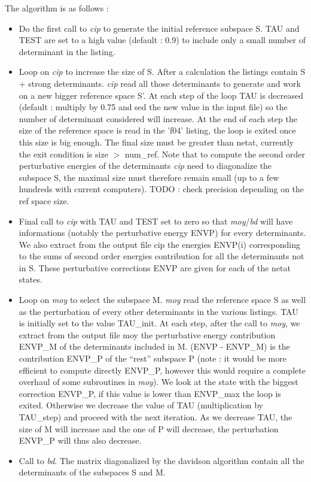 \documentclass[a4paper,10pt]{article}
\begin{document}
The algorithm is as follows :
\begin{itemize}
 \item Do the first call to \textit{cip} to generate the initial reference subspace S. TAU and TEST are set to a high value (default : 0.9) to include only a small number of determinant in the listing.
 \item Loop on \textit{cip} to increase the size of S. After a calculation the listings contain S + strong determinants. \textit{cip} read all those determinants to generate and work on a new bigger reference space S'. At each step of the loop TAU is decreased (default : multiply by 0.75 and sed the new value in the input file) so the number of determinant considered will increase. At the end of each step the size of the reference space is read in the 'f04' listing, the loop is exited once this size is big enough. The final size must be greater than netat, currently the exit condition is size $>$ num\_ref. Note that to compute the second order perturbative energies of the determinants \textit{cip} need to diagonalize the subspace S, the maximal size must therefore remain small (up to a few hundreds with current computers).
 TODO : check precision depending on the ref space size.
 \item Final call to \textit{cip} with TAU and TEST set to zero so that \textit{moy}/\textit{bd} will have informations (notably the perturbative energy ENVP) for every determinants. We also extract from the output file cip the energies ENVP(i) corresponding to the sums of second order energies contribution for all the determinants not in S. These perturbative corrections ENVP are given for each of the netat states. 
 \item Loop on \textit{moy} to select the subspace M. \textit{moy} read the reference space S as well as the perturbation of every other determinants in the various listings. TAU is initially set to the value TAU\_init. At each step, after the call to \textit{moy}, we extract from the output file moy the perturbative energy contribution ENVP\_M of the determinants included in M. (ENVP - ENVP\_M) is the contribution ENVP\_P of the ``rest'' subspace P (note : it would be more efficient to compute directly ENVP\_P, however this would require a complete overhaul of some subroutines in \textit{moy}). We look at the state with the biggest correction ENVP\_P, if this value is lower than ENVP\_max the loop is exited. Otherwise we decrease the value of TAU (multiplication by TAU\_step) and proceed with the next iteration. As we decrease TAU, the size of M will increase and the one of P will decrease, the perturbation ENVP\_P will thus also decrease.    
 \item Call to \textit{bd}. The matrix diagonalized by the davidson algorithm contain all the determinants of the subspaces S and M. 
\end{itemize}
\end{document}
